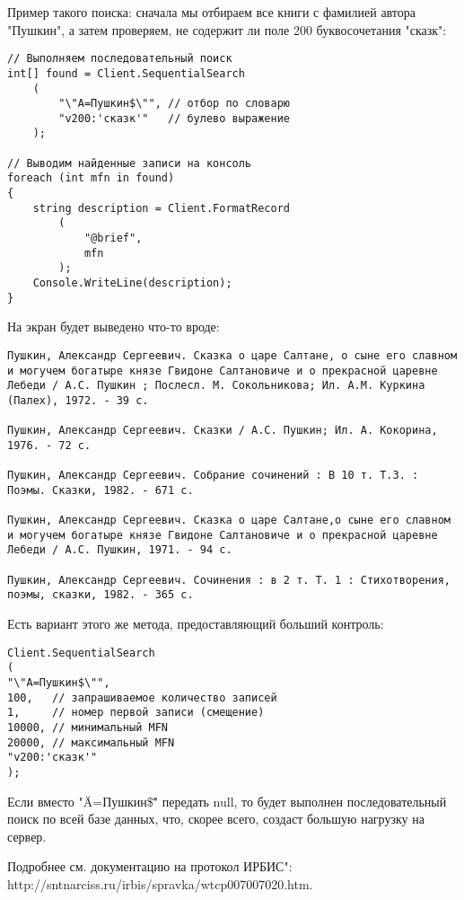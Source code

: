 Пример такого поиска: сначала мы отбираем все книги с фамилией автора "Пушкин", а затем проверяем, не содержит ли поле 200 буквосочетания "сказк": 
\begin{lstlisting}
// Выполняем последовательный поиск
int[] found = Client.SequentialSearch
    (
        "\"A=Пушкин$\"", // отбор по словарю
        "v200:'сказк'"   // булево выражение
    );

// Выводим найденные записи на консоль
foreach (int mfn in found)
{
    string description = Client.FormatRecord
        (
            "@brief",
            mfn
        );
    Console.WriteLine(description);
}
\end{lstlisting}
На экран будет выведено что-то вроде: 
\begin{verbatim}
Пушкин, Александр Сергеевич. Сказка о царе Салтане, о сыне его славном и могучем богатыре князе Гвидоне Салтановиче и о прекрасной царевне Лебеди / А.С. Пушкин ; Послесл. М. Сокольникова; Ил. А.М. Куркина (Палех), 1972. - 39 c. 

Пушкин, Александр Сергеевич. Сказки / А.С. Пушкин; Ил. А. Кокорина, 1976. - 72 с. 

Пушкин, Александр Сергеевич. Собрание сочинений : В 10 т. Т.3. : Поэмы. Сказки, 1982. - 671 с. 

Пушкин, Александр Сергеевич. Сказка о царе Салтане,о сыне его славном и могучем богатыре князе Гвидоне Салтановиче и о прекрасной царевне Лебеди / А.С. Пушкин, 1971. - 94 с. 

Пушкин, Александр Сергеевич. Сочинения : в 2 т. Т. 1 : Стихотворения, поэмы, сказки, 1982. - 365 с. 
\end{verbatim}

Есть вариант этого же метода, предоставляющий больший контроль: 
\begin{lstlisting}
Client.SequentialSearch
(
"\"A=Пушкин$\"",
100,   // запрашиваемое количество записей
1,     // номер первой записи (смещение)
10000, // минимальный MFN
20000, // максимальный MFN
"v200:'сказк'"        
);
\end{lstlisting}
Если вместо "\"A=Пушкин\$\"" передать null, то будет выполнен последовательный поиск по всей базе данных, что, скорее всего, создаст большую нагрузку на сервер. 

Подробнее см. документацию на протокол ИРБИС": http://sntnarciss.ru/irbis/spravka/wtcp007007020.htm.